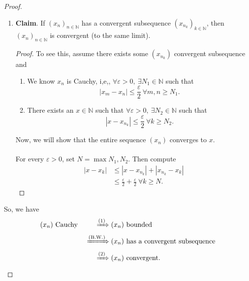 \documentclass{article}
\newcommand{\N}{\mathbb{N}}
\newcommand{\seq}[2]{(#1_{#2})_{#2 \in \N}}
\newcommand{\?}{\stackrel{?}{=}}
\theoremstyle{definition} %
\begin{document}
\begin{itemize}
\begin{proof}
\begin{enumerate}[label=(\arabic*)]
\begin{proof}
                            This proof is omitted because it is almost identical to the proof as convergent implies bounded.
                        \end{proof}
                  \item \textbf{Claim}. If $\seq{x}{n}$ has a convergent subsequence $(x_{n_k})_{k \in \N}$, then $\seq{x}{n}$ is convergent (to the same limit).
                        \begin{proof}
                            To see this, assume there exists some $(x_{n_k})$ convergent subsequence and
                            \begin{enumerate}[label=(\roman*)]
                                \item We know $x_n$ is Cauchy, i,e,, $\forall \varepsilon > 0, \ \exists N_1 \in \N$ such that
                                      $$|x_m - x_n| \leq \frac{\varepsilon}{2} \ \forall m, n \geq N_1.$$
                                \item There exists an $x \in \N$ such that $\forall \varepsilon > 0, \ \exists N_2 \in \N$ such that
                                      $$|x - x_{n_k}| \leq \frac{\varepsilon}{2} \ \forall k \geq N_2.$$
                            \end{enumerate}
                            Now, we will show that the entire sequence $(x_n)$ converges to $x$. \\\\
                            For every $\varepsilon > 0$, set $N = \max{N_1, N_2}$. Then compute
                            \begin{align*}
                                |x - x_k| & \leq |x - x_{n_k}| + |x_{n_k} - x_k|                                   \\
                                          & \leq \frac{\varepsilon}{2} + \frac{\varepsilon}{2} \ \forall k \geq N.
                            \end{align*}
                        \end{proof}
              \end{enumerate}
              So, we have
              \begin{alignat*}{2}
                  (x_n) \text{ Cauchy } &  & \xRightarrow{\text{(1)}} (x_n)    & \text{ bounded }                     \\
                                        &  & \xRightarrow{\text{(B.W.)}} (x_n) & \text{ has a convergent subsequence} \\
                                        &  & \xRightarrow{\text{(2)}} (x_n)    & \text{ convergent}.
              \end{alignat*}
          \end{proof}
\end{itemize}
\end{document}
